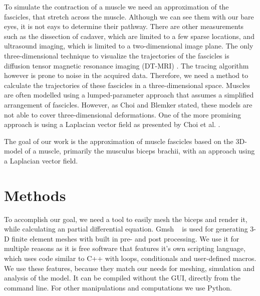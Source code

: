\documentclass[preprint,journal]{vgtc}       %
\begin{document}
To simulate the contraction of a muscle we need an approximation of the fascicles, that stretch across the muscle. 
Although we can see them with our bare eyes, it is not eays to determine their pathway. 
There are other measurements such as the dissection of cadaver, which are limited to a few sparse locations, and ultrasound imaging, which is limited to a two-dimensional image plane.
The only three-dimensional technique to visualize the trajectories of the fascicles is diffusion tensor magnetic resonance imaging (DT-MRI) \cite{Choi2013}.
The tracing algorithm however is prone to noise in the acquired data.
Therefore, we need a method to calculate the trajectories of these fascicles in a three-dimensional space.
Muscles are often modelled using a lumped-parameter approach that assumes a simplified arrangement of fascicles. 
However, as Choi and Blemker \cite{Choi2013} stated, these models are not able to cover three-dimensional deformations.
One of the more promising approach is using a Laplacian vector field as presented by Choi et al. \cite{Choi2013}. 

The goal of our work is the approximation of muscle fascicles based on the 3D-model of a muscle, primarily the musculus biceps brachii, with an approach using a Laplacian vector field. 

%
%
%
\section{Methods}
To accomplish our goal, we need a tool to easily mesh the biceps and render it, while calculating an partial differential equation. 
Gmsh ~\cite{Geuzaine2009} is used for generating 3-D finite element meshes with built in pre- and post processing. 
We use it for multiple reasons as it is free software that features it's own scripting language, which uses code similar to C++ with loops, conditionals and user-defined macros.
We use these features, because they match our needs for meshing, simulation and analysis of the model. 
It can be compiled without the GUI, directly from the command line. 
For other manipulations and computations we use Python.
\end{document}
